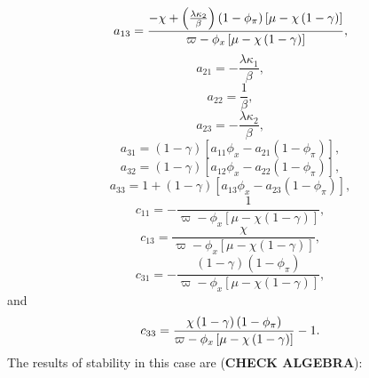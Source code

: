 \documentclass{article}
\begin{document}
\begin{equation*}
a_{13}=\frac{-\chi +\left( \frac{\lambda \kappa _{2}}{\beta }\right) \left(
1-\phi _{\pi }\right) \left[ \mu -\chi \left( 1-\gamma \right) \right] }{%
\varpi -\phi _{x}\left[ \mu -\chi \left( 1-\gamma \right) \right] },
\end{equation*}%
\begin{equation*}
a_{21}=-\frac{\lambda \kappa _{1}}{\beta },
\end{equation*}%
\begin{equation*}
a_{22}=\frac{1}{\beta },
\end{equation*}%
\begin{equation*}
a_{23}=-\frac{\lambda \kappa _{2}}{\beta },
\end{equation*}%
\begin{equation*}
a_{31}=\left( 1-\gamma \right) \left[ a_{11}\phi _{x}-a_{21}\left( 1-\phi
_{\pi }\right) \right] ,
\end{equation*}%
\begin{equation*}
a_{32}=\left( 1-\gamma \right) \left[ a_{12}\phi _{x}-a_{22}\left( 1-\phi
_{\pi }\right) \right] ,
\end{equation*}%
\begin{equation*}
a_{33}=1+\left( 1-\gamma \right) \left[ a_{13}\phi _{x}-a_{23}\left( 1-\phi
_{\pi }\right) \right] ,
\end{equation*}%
\begin{equation*}
c_{11}=-\frac{1}{\varpi -\phi _{x}\left[ \mu -\chi \left( 1-\gamma \right) %
\right] },
\end{equation*}%
\begin{equation*}
c_{13}=\frac{\chi }{\varpi -\phi _{x}\left[ \mu -\chi \left( 1-\gamma
\right) \right] },
\end{equation*}%
\begin{equation*}
c_{31}=-\frac{\left( 1-\gamma \right) \left( 1-\phi _{\pi }\right) }{\varpi
-\phi _{x}\left[ \mu -\chi \left( 1-\gamma \right) \right] },
\end{equation*}%
and%
\begin{equation*}
c_{33}=\frac{\chi \left( 1-\gamma \right) \left( 1-\phi _{\pi }\right) }{%
\varpi -\phi _{x}\left[ \mu -\chi \left( 1-\gamma \right) \right] }-1.
\end{equation*}%
The results of stability in this case are (\textbf{CHECK ALGEBRA}):
\end{document}
